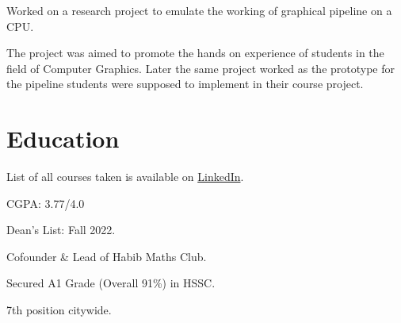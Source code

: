 \documentclass[]{resume}
\begin{document}
\begin{minipage}[t]{0.5\textwidth}

    \begin{tightemize}
        \sectionsep
        \item Worked on a research project to emulate the working of graphical pipeline on a CPU.
        \item The project was aimed to promote the hands on experience of students in the field of Computer Graphics. Later the same project worked as the prototype for the pipeline students were supposed to implement in their course project.
    \end{tightemize}


    \section{Education}
     
    \begin{tightemize}
        \sectionsep
        \item List of all courses taken is available on \href{https://www.linkedin.com/in/meesumaliqazalbash/details/courses/}{LinkedIn}.
        \item CGPA: 3.77/4.0
        \item Dean's List: Fall 2022.
        \item Cofounder \& Lead of Habib Maths Club.
    \end{tightemize}

    \sectionsep

     
    \begin{tightemize}
        \item Secured A1 Grade (Overall 91\%) in HSSC.
        \item 7th position citywide.
    \end{tightemize}


\end{minipage}
\end{document}
